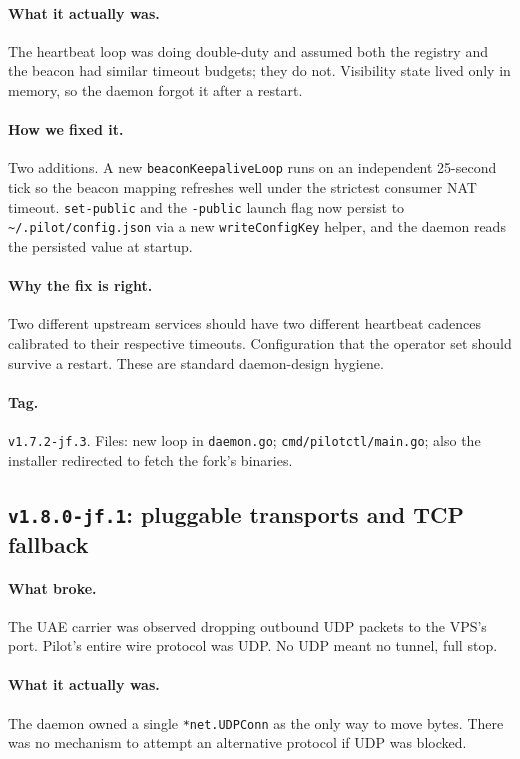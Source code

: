 \documentclass[11pt,a4paper]{article}
\begin{document}
\paragraph{What it actually was.} The heartbeat loop was doing
double-duty and assumed both the registry and the beacon had
similar timeout budgets; they do not. Visibility state lived
only in memory, so the daemon forgot it after a restart.

\paragraph{How we fixed it.} Two additions. A new
\texttt{beaconKeepaliveLoop} runs on an independent 25-second
tick so the beacon mapping refreshes well under the strictest
consumer NAT timeout. \texttt{set-public} and the
\texttt{-public} launch flag now persist to
\texttt{\~{}/.pilot/config.json} via a new \texttt{writeConfigKey}
helper, and the daemon reads the persisted value at startup.

\paragraph{Why the fix is right.} Two different upstream services
should have two different heartbeat cadences calibrated to their
respective timeouts. Configuration that the operator set should
survive a restart. These are standard daemon-design hygiene.

\paragraph*{Tag.} \texttt{v1.7.2-jf.3}. Files: new loop in
\texttt{daemon.go}; \texttt{cmd/pilotctl/main.go}; also the
installer redirected to fetch the fork's binaries.

\subsection{\texttt{v1.8.0-jf.1}: pluggable transports and TCP
fallback}

\paragraph{What broke.} The UAE carrier was observed dropping
outbound UDP packets to the VPS's port. Pilot's entire wire
protocol was UDP. No UDP meant no tunnel, full stop.

\paragraph{What it actually was.} The daemon owned a single
\texttt{*net.UDPConn} as the only way to move bytes. There was
no mechanism to attempt an alternative protocol if UDP was
blocked.
\end{document}
